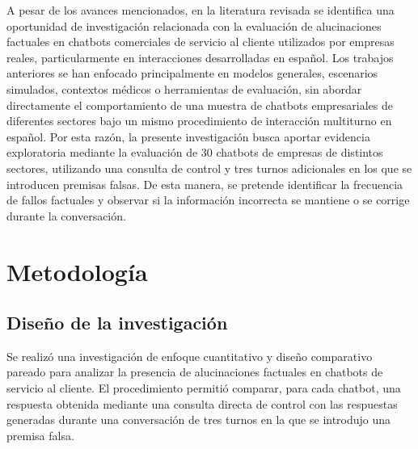 \documentclass[manuscrito,spanish]{rcc}
\begin{document}
A pesar de los avances mencionados, en la literatura revisada se identifica una oportunidad de investigación relacionada con la evaluación de alucinaciones factuales en chatbots comerciales de servicio al cliente utilizados por empresas reales, particularmente en interacciones desarrolladas en español. Los trabajos anteriores se han enfocado principalmente en modelos generales, escenarios simulados, contextos médicos o herramientas de evaluación, sin abordar directamente el comportamiento de una muestra de chatbots empresariales de diferentes sectores bajo un mismo procedimiento de interacción multiturno en español. Por esta razón, la presente investigación busca aportar evidencia exploratoria mediante la evaluación de 30 chatbots de empresas de distintos sectores, utilizando una consulta de control y tres turnos adicionales en los que se introducen premisas falsas. De esta manera, se pretende identificar la frecuencia de fallos factuales y observar si la información incorrecta se mantiene o se corrige durante la conversación.


\section{Metodología}\label{sec:metodologia}
\subsection{Diseño de la investigación}
Se realizó una investigación de enfoque cuantitativo y diseño comparativo pareado para analizar la presencia de alucinaciones factuales en chatbots de servicio al cliente. El procedimiento permitió comparar, para cada chatbot, una respuesta obtenida mediante una consulta directa de control con las respuestas generadas durante una conversación de tres turnos en la que se introdujo una premisa falsa.
\end{document}

